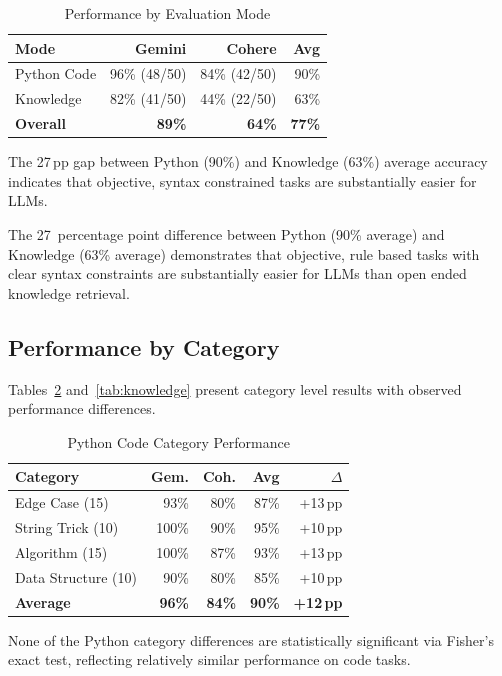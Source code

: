 \documentclass[12pt,a4paper]{article}
\begin{document}
\begin{table}[ht]
\centering
\caption{Performance by Evaluation Mode}
\label{tab:mode}
\begin{tabular}{l r r r}
\toprule
\textbf{Mode} & \textbf{Gemini} & \textbf{Cohere} & \textbf{Avg} \\
\midrule
Python Code    & 96\% (48/50) & 84\% (42/50) & 90\% \\
Knowledge      & 82\% (41/50) & 44\% (22/50) & 63\% \\
\midrule
\textbf{Overall} & \textbf{89\%} & \textbf{64\%} & \textbf{77\%} \\
\bottomrule
\end{tabular}

\smallskip
\footnotesize The 27\,pp gap between Python (90\%) and Knowledge (63\%) average accuracy indicates that objective, syntax constrained tasks are substantially easier for LLMs.
\end{table}

The 27~percentage point difference between Python (90\% average) and Knowledge (63\% average) demonstrates that objective, rule based tasks with clear syntax constraints are substantially easier for LLMs than open ended knowledge retrieval.

\subsection{Performance by Category}

Tables~\ref{tab:python} and~\ref{tab:knowledge} present category level results with observed performance differences.

\begin{table}[ht]
\centering
\caption{Python Code Category Performance}
\label{tab:python}
\begin{tabular}{l r r r r}
\toprule
\textbf{Category} & \textbf{Gem.} & \textbf{Coh.} & \textbf{Avg} & \textbf{$\Delta$} \\
\midrule
Edge Case (15)      & 93\% & 80\% & 87\% & +13\,pp \\
String Trick (10)   & 100\% & 90\% & 95\% & +10\,pp \\
Algorithm (15)      & 100\% & 87\% & 93\% & +13\,pp \\
Data Structure (10) & 90\% & 80\% & 85\% & +10\,pp \\
\midrule
\textbf{Average}    & \textbf{96\%} & \textbf{84\%} & \textbf{90\%} & \textbf{+12\,pp} \\
\bottomrule
\end{tabular}

\smallskip
\footnotesize None of the Python category differences are statistically significant via Fisher's exact test, reflecting relatively similar performance on code tasks.
\end{table}
\end{document}
